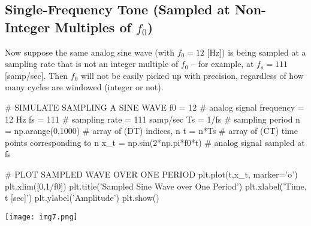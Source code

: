 \documentclass{report}
\begin{document}
\subsection{Single-Frequency Tone (Sampled at Non-Integer Multiples of $f_0$)}
Now suppose the same analog sine wave (with $f_0 = 12$ [Hz]) is being sampled at a sampling rate that is not an integer multiple of $f_0$ -- for example, at $f_s = 111$ [samp/sec]. 
Then $f_0$ will not be easily picked up with precision, regardless of how many cycles are windowed (integer or not).
\begin{python}
# SIMULATE SAMPLING A SINE WAVE
f0 = 12                        # analog signal frequency = 12 Hz
fs = 111                       # sampling rate = 111 samp/sec
Ts = 1/fs                      # sampling period
n = np.arange(0,1000)          # array of (DT) indices, n
t = n*Ts                       # array of (CT) time points corresponding to n
x_t = np.sin(2*np.pi*f0*t)     # analog signal sampled at fs

# PLOT SAMPLED WAVE OVER ONE PERIOD
plt.plot(t,x_t, marker='o')
plt.xlim([0,1/f0])
plt.title('Sampled Sine Wave over One Period')
plt.xlabel('Time, t [sec]')
plt.ylabel('Amplitude')
plt.show()
\end{python}
\texttt{[image: img7.png]}
\end{document}
